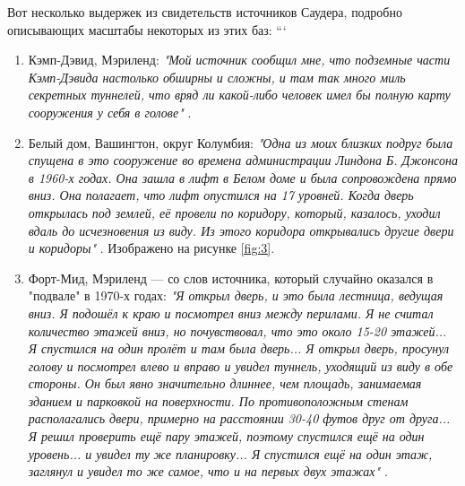 \documentclass[10pt,twocolumn,letterpaper]{article}
\begin{document}
Вот несколько выдержек из свидетельств источников Саудера, подробно описывающих масштабы некоторых из этих баз:
```
\begin{flushleft}
\begin{enumerate}
    \item Кэмп-Дэвид, Мэриленд: \textit{"Мой источник сообщил мне, что подземные части Кэмп-Дэвида настолько обширны и сложны, и там так много миль секретных туннелей, что вряд ли какой-либо человек имел бы полную карту сооружения у себя в голове"} \cite{22}.
    \item Белый дом, Вашингтон, округ Колумбия: \textit{"Одна из моих близких подруг была спущена в это сооружение во времена администрации Линдона Б. Джонсона в 1960-х годах. Она зашла в лифт в Белом доме и была сопровождена прямо вниз. Она полагает, что лифт опустился на 17 уровней. Когда дверь открылась под землей, её провели по коридору, который, казалось, уходил вдаль до исчезновения из виду. Из этого коридора открывались другие двери и коридоры"} \cite{22}. Изображено на рисунке \ref{fig:3}.
    \item Форт-Мид, Мэриленд — со слов источника, который случайно оказался в "подвале" в 1970-х годах: \textit{"Я открыл дверь, и это была лестница, ведущая вниз. Я подошёл к краю и посмотрел вниз между перилами. Я не считал количество этажей вниз, но почувствовал, что это около 15-20 этажей... Я спустился на один пролёт и там была дверь... Я открыл дверь, просунул голову и посмотрел влево и вправо и увидел туннель, уходящий из виду в обе стороны. Он был явно значительно длиннее, чем площадь, занимаемая зданием и парковкой на поверхности. По противоположным стенам располагались двери, примерно на расстоянии 30-40 футов друг от друга... Я решил проверить ещё пару этажей, поэтому спустился ещё на один уровень... и увидел ту же планировку... Я спустился ещё на один этаж, заглянул и увидел то же самое, что и на первых двух этажах"} \cite{22}.
\end{enumerate}
\end{flushleft}
\end{document}
